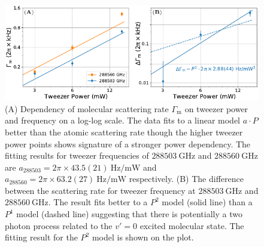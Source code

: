 \begin{figure}
  \centering
  \includegraphics[width=\textwidth]{figures/raman_transfer_scatter_scaling_mol2.pdf}
  \caption[Molecular scattering rate as a function of tweezer power and frequency]{
    (A) Dependency of molecular scattering rate $\Gamma_{\mathrm{m}}$
    on tweezer power and frequency on a log-log scale.
    The data fits to a linear model $a\cdot P$ better than the atomic scattering rate
    though the higher tweezer power points shows signature of a stronger power dependency.
    The fitting results for tweezer frequencies of
    $288503~\mathrm{GHz}$ and $288560~\mathrm{GHz}$ are
    $a_{288503}=2\pi\times43.5(21)~\mathrm{Hz/mW}$
    and $a_{288560}=2\pi\times63.2(27)~\mathrm{Hz/mW}$ respectively.
    (B) The difference between the scattering rate for tweezer frequency at
    $288503~\mathrm{GHz}$ and $288560~\mathrm{GHz}$.
    The result fits better to a $P^2$ model (solid line) than a $P^1$ model (dashed line)
    suggesting that there is potentially a two photon process
    related to the $v'=0$ excited molecular state.
    The fitting result for the $P^2$ model is shown on the plot.
    \label{fig:raman-transfer:results:scaling:gamma-mol}}
\end{figure}

